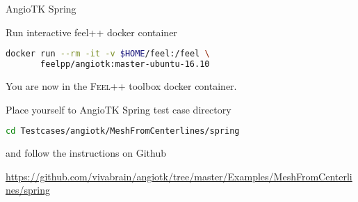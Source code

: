 \begin{frame}[fragile]{AngioTK Spring}

Run  interactive feel++ docker container

\begin{lstlisting}[language=Bash,mathescape=false,emph={docker}]
docker run --rm -it -v $HOME/feel:/feel \
       feelpp/angiotk:master-ubuntu-16.10
\end{lstlisting}

You are now in the \textsc{Feel++} toolbox docker container.

Place yourself to AngioTK Spring test case directory

\begin{lstlisting}[language=Bash,mathescape=false]
cd Testcases/angiotk/MeshFromCenterlines/spring
\end{lstlisting}

and follow the instructions on Github

\centerline{\tiny\url{https://github.com/vivabrain/angiotk/tree/master/Examples/MeshFromCenterlines/spring}}

\end{frame}


